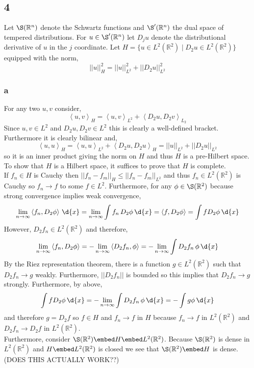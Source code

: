 \documentclass[12pt]{article}
\newcommand{\inner}[2]{\left< #1, #2 \right>}
\newcommand{\R}{\mathbb{R}}
\begin{document}
\subsection{4}

Let $\S(\R^n)$ denote the Schwartz functions and $\S'(\R^n)$ the dual space of tempered distributions. For $u \in \S'(\R^n)$ let $D_j u$ denote the distributional derivative of $u$ in the $j$ coordinate. Let $H = \{ u \in L^2(\R^2) \mid D_2 u \in L^2(\R^2) \}$ equipped with the norm,
\[ || u ||_H^2 = || u ||_{L^2}^2 + || D_2  u ||_{L^2}^2 \]

\subsubsection{a}

For any two $u, v$ consider,
\[ \inner{u}{v}_H = \inner{u}{v}_{L^2} + \inner{D_2 u}{D_2 v}_{L_2} \]
Since $u,v \in L^2$ and $D_2 u, D_2 v \in L^2$ this is clearly a well-defined bracket. Furthermore it is clearly bilinear and,
\[ \inner{u}{u}_H = \inner{u}{u}_{L^2} + \inner{D_2 u}{D_2 u}_H = || u ||_{L^2} + || D_2 u ||_{L^2} \]
so it is an inner product giving the norm on $H$ and thus $H$ is a pre-Hilbert space. To show that $H$ is a Hilbert space, it suffices to prove that $H$ is complete. 
\bigskip\\
If $f_n \in H$ is Cauchy then $|| f_n - f_m ||_H \le || f_n - f_m ||_{L^2}$ and thus $f_n \in L^2(\R^2)$ is Cauchy so $f_n \to f$ to some $f \in L^2$. Furthermore, for any $\phi \in \S(\R^2)$ because strong convergence implies weak convergence,
\[ \lim_{n \to \infty} \inner{f_n}{D_2 \phi} \, \d{x} = \lim_{n \to \infty} \int f_n \, D_2 \phi \, \d{x} = \inner{f}{D_2 \phi} = \int f D_2 \phi \, \d{x} \]
However, $D_2 f_n \in L^2(\R^2)$ and therefore,
\[ \lim_{n \to \infty} \inner{f_n}{D_2 \phi} = - \lim_{n \to \infty} \inner{D_2 f_n}{\phi} = - \lim_{n \to \infty} \int D_2 f_n \, \phi \, \d{x} \]
By the Riez representation theorem, there is a function $g \in L^2(\R^2)$ such that $D_2 f_n \to g$ weakly. Furthermore, $|| D_2 f_n ||$ is bounded so this implies that $D_2 f_n \to g$ strongly. Furthermore, by above,
\[ \int f D_2 \phi \, \d{x} = - \lim_{n \to \infty} \int D_2 f_n \, \phi \, \d{x} = - \int g \phi \, \d{x} \]
and therefore $g = D_2 f$ so $f \in H$ and $f_n \to f$ in $H$ because $f_n \to f$ in $L^2(\R^2)$ and $D_2 f_n \to D_2 f$ in $L^2(\R^2)$.
\bigskip\\
Furthermore, consider $\S(\R^2) \embed H \embed L^2(\R^2)$. Because $\S(\R^2)$ is dense in $L^2(\R^2)$ and $H \embed L^2(\R^2)$ is closed we see that $\S(\R^2) \embed H$ is dense. (DOES THIS ACTUALLY WORK??)
\end{document}
